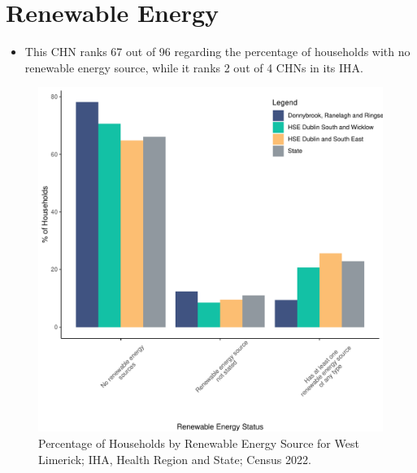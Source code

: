 \documentclass{article}
\begin{document}
\section{Renewable Energy}\label{sect:RE}
\begin{itemize}
\item This CHN ranks  67 out of 96 regarding the percentage of households with no renewable energy source, while it ranks   2 out of 4 CHNs in its IHA.
\end{itemize}
\begin{figure}[H]
	\centering
	\includegraphics[width = 140mm]{../figures/RenewableEnergyED.pdf}
	\caption{Percentage of Households by Renewable Energy Source for West Limerick; IHA, Health Region and State; Census 2022.}
	\label{fig:vbnv}
	\end{figure}
\end{document}
